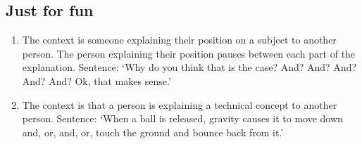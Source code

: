 \documentclass[11pt]{article}
\begin{document}
\subsection{Just for fun}
\begin{enumerate}
    \item The context is someone explaining their position on a subject to another person. The person explaining their position pauses between each part of the explanation. Sentence: `Why do you think that is the case? And? And? And? And? And? Ok, that makes sense.'
    \item The context is that a person is explaining a technical concept to another person. Sentence: `When a ball is released, gravity causes it to move down and, or, and, or, touch the ground and bounce back from it.'
\end{enumerate}
\end{document}
